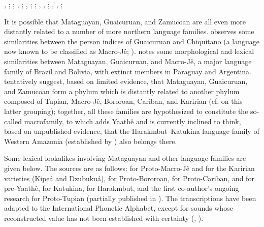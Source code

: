 \begin{exe}
    \ex {} {\sep} ; ; 
    \ex {} {\sep} ; 
    \ex {} {\sep} ; ; 
    \ex {} {\sep}  {\sep} ; 
    \ex {} {\sep}  {\sep} ; 
\end{exe}

It is possible that Mataguayan, Guaicuruan, and Zamucoan are all even more distantly related to a number of more northern language families. \citet{SLQ10} observes some similarities between the person indices of Guaicuruan and Chiquitano (a language now known to be classified as Macro-Jê; ). \citet{PVB05} notes some morphological and lexical similarities between Mataguayan, Guaicuruan, and Macro-Jê, a major language family of Brazil and Bolivia, with extinct members in Paraguay and Argentina. \citet[552--555]{AN-FC-18} tentatively suggest, based on limited evidence, that Mataguayan, Guaicuruan, and Zamucoan form a phylum which is distantly related to another phylum composed of Tupian, Macro-Jê, Bororoan, Cariban, and Karirian (cf.  on this latter grouping); together, all these families are hypothesized to constitute the so-called  macrofamily, to which \citet[79--80]{AN20} adds Yaathê and is currently inclined to think, based on unpublished evidence, that the Harakmbut--Katukina language family of Western Amazonia (established by ) also belongs there.

Some lexical lookalikes involving Mataguayan and other language families are given below. The sources are as follows: \citet{AN20} for Proto-Macro-Jê and for the Karirian varieties (Kipeá and Dzubukuá), \citet{LSC13} for Proto-Bororoan, \citet{SG-DP-07} for Proto-Cariban, \citet{MACS-ms} and  for pre-Yaathê, \citet{ZdA11} for Katukina, \citet{RT95} for Harakmbut, and the first co-author's ongoing research for Proto-Tupian (partially published in ). The transcriptions have been adapted to the International Phonetic Alphabet, except for sounds whose reconstructed value has not been established with certainty (, ).

